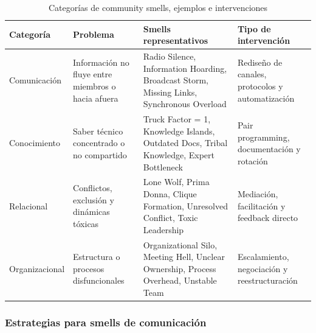 \begin{table}[h]
    \centering
    \small
    \begin{tabularx}{\textwidth}{|l|X|X|X|}
        \hline
        \textbf{Categoría} & \textbf{Problema}                                                                         & \textbf{Smells representativos} & \textbf{Tipo de intervención} \\
        \hline
        Comunicación
                           & Información no fluye entre miembros o hacia afuera
                           & Radio Silence, Information Hoarding, Broadcast Storm, Missing Links, Synchronous Overload
                           & Rediseño de canales, protocolos y automatización                                                                                                            \\
        \hline
        Conocimiento
                           & Saber técnico concentrado o no compartido
                           & Truck Factor = 1, Knowledge Islands, Outdated Docs, Tribal Knowledge, Expert Bottleneck
                           & Pair programming, documentación y rotación                                                                                                                  \\
        \hline
        Relacional
                           & Conflictos, exclusión y dinámicas tóxicas
                           & Lone Wolf, Prima Donna, Clique Formation, Unresolved Conflict, Toxic Leadership
                           & Mediación, facilitación y feedback directo                                                                                                                  \\
        \hline
        Organizacional
                           & Estructura o procesos disfuncionales
                           & Organizational Silo, Meeting Hell, Unclear Ownership, Process Overhead, Unstable Team
                           & Escalamiento, negociación y reestructuración                                                                                                                \\
        \hline
    \end{tabularx}
    \caption{Categorías de community smells, ejemplos e intervenciones}
    \label{tab:categorias-smells}
\end{table}
\FloatBarrier

\subsubsection{Estrategias para smells de comunicación}

